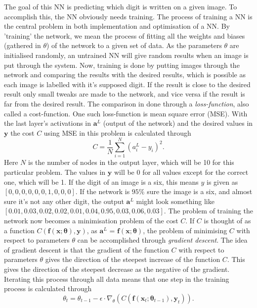 \documentclass{article}
\begin{document}
\noindent The goal of this NN is predicting which digit is written on a given image. To accomplish this, the NN obviously needs training. The process of training a NN is the central problem in both implementation and optimisation of a NN. By 'training' the network, we mean the process of fitting all the weights and biases (gathered in $\theta$) of the network to a given set of data. As the parameters $\theta$ are initialised randomly, an untrained NN will give random results when an image is put through the system. Now, training is done by putting images through the network and comparing the results with the desired results, which is possible as each image is labelled with it's supposed digit. If the result is close to the desired result only small tweaks are made to the network, and vice versa if the result is far from the desired result. The comparison in done through a \textit{loss-function}, also called a cost-function. One such loss-function is mean square error (MSE). With the last layer's activations in $\mathbf{a}^L$ (output of the network) and the desired values in $\mathbf{y}$ the cost $C$ using MSE in this problem is calculated through
\begin{equation}\label{eq:MSE}
    C = \frac{1}{N}\sum^{N}_{i=1}(a_i^L-y_i)^2.
\end{equation}
\noindent Here $N$ is the number of nodes in the output layer, which will be 10 for this particular problem. The values in $\mathbf{y}$ will be 0 for all values except for the correct one, which will be 1. If the digit of an image is a six, this means $y$ is given as $[0, 0, 0, 0, 0, 0, 1, 0, 0, 0]$. If the network is $95\%$ sure the image is a six, and almost sure it's not any other digit, the output $\mathbf{a}^L$ might look something like $[0.01, 0.03, 0.02, 0.02, 0.01, 0.04, 0.95, 0.03, 0.06, 0.03]$. The problem of training the network now becomes a minimisation problem of the cost $C$. If $C$ is thought of as a function $C\left(\mathbf{f}(\mathbf{x}; \mathbf{\theta}), \mathbf{y}\right)$, as $\mathbf{a}^L$ = $\mathbf{f}(\mathbf{x}; \mathbf{\theta})$, the problem of minimising $C$ with respect to parameters $\theta$ can be accomplished through \textit{gradient descent}. The idea of gradient descent is that the gradient of the function $C$ with respect to parameters $\theta$ gives the direction of the steepest increase of the function $C$. This gives the direction of the steepest decrease as the negative of the gradient. Iterating this process through all data means that one step in the training process is calculated through
\begin{equation}
    \theta_t = \theta_{t-1} - \epsilon\cdot\nabla_\theta\left( C\left(\mathbf{f}(\mathbf{x}_t; \mathbf{\theta}_{t-1}), \mathbf{y}_t\right)\right).
\end{equation}
\end{document}
